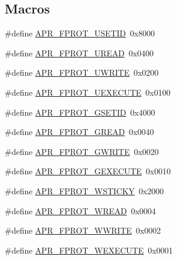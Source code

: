 \subsection*{Macros}
\begin{DoxyCompactItemize}
\item 
\#define \hyperlink{group__apr__file__permissions_ga67caebf5bbe4f3f4b6252a75e5ce066f}{A\+P\+R\+\_\+\+F\+P\+R\+O\+T\+\_\+\+U\+S\+E\+T\+ID}~0x8000
\item 
\#define \hyperlink{group__apr__file__permissions_gaab6c4c2e7b95f4345c248c27b3f1a655}{A\+P\+R\+\_\+\+F\+P\+R\+O\+T\+\_\+\+U\+R\+E\+AD}~0x0400
\item 
\#define \hyperlink{group__apr__file__permissions_ga50b985779b15fbfdae0758e98ffb92af}{A\+P\+R\+\_\+\+F\+P\+R\+O\+T\+\_\+\+U\+W\+R\+I\+TE}~0x0200
\item 
\#define \hyperlink{group__apr__file__permissions_ga156e1374a4ef30e745340d8c20b36d03}{A\+P\+R\+\_\+\+F\+P\+R\+O\+T\+\_\+\+U\+E\+X\+E\+C\+U\+TE}~0x0100
\item 
\#define \hyperlink{group__apr__file__permissions_ga5fcf6746afdd4e9b8be6ceab6892a3f5}{A\+P\+R\+\_\+\+F\+P\+R\+O\+T\+\_\+\+G\+S\+E\+T\+ID}~0x4000
\item 
\#define \hyperlink{group__apr__file__permissions_ga5ad9b67b8008db3ffc56c3c2a65aa192}{A\+P\+R\+\_\+\+F\+P\+R\+O\+T\+\_\+\+G\+R\+E\+AD}~0x0040
\item 
\#define \hyperlink{group__apr__file__permissions_gacecdc9f88b04c768150418688b786500}{A\+P\+R\+\_\+\+F\+P\+R\+O\+T\+\_\+\+G\+W\+R\+I\+TE}~0x0020
\item 
\#define \hyperlink{group__apr__file__permissions_gab627bef3f9ceb84bbf00906eaeb12184}{A\+P\+R\+\_\+\+F\+P\+R\+O\+T\+\_\+\+G\+E\+X\+E\+C\+U\+TE}~0x0010
\item 
\#define \hyperlink{group__apr__file__permissions_ga989dbea02f779a5f20a643d7e4ee9952}{A\+P\+R\+\_\+\+F\+P\+R\+O\+T\+\_\+\+W\+S\+T\+I\+C\+KY}~0x2000
\item 
\#define \hyperlink{group__apr__file__permissions_ga194718630250b0f0dd4be38c86dac717}{A\+P\+R\+\_\+\+F\+P\+R\+O\+T\+\_\+\+W\+R\+E\+AD}~0x0004
\item 
\#define \hyperlink{group__apr__file__permissions_ga51692a9828f5b6288d89495378944260}{A\+P\+R\+\_\+\+F\+P\+R\+O\+T\+\_\+\+W\+W\+R\+I\+TE}~0x0002
\item 
\#define \hyperlink{group__apr__file__permissions_ga760d69c09b38ddf1e0aff09362d8ce11}{A\+P\+R\+\_\+\+F\+P\+R\+O\+T\+\_\+\+W\+E\+X\+E\+C\+U\+TE}~0x0001
\item 

\end{DoxyCompactItemize}

